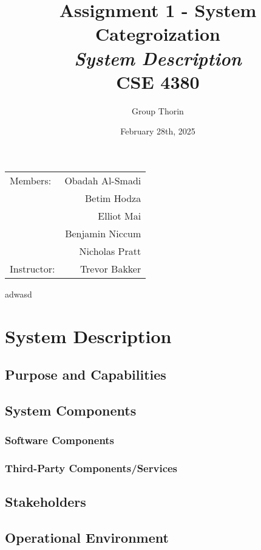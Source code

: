 \documentclass{article}
\title{Assignment 1 - System Categroization \\ \textit{System Description}\\ CSE 4380}
\author{Group Thorin}
\date{February 28th, 2025}
\begin{document}
\maketitle
\begin{center}
\begin{tabular}{l r}

Members: 	& Obadah Al-Smadi\\
			& Betim Hodza\\
			& Elliot Mai\\
			& Benjamin Niccum\\
        	& Nicholas Pratt\\
Instructor: & Trevor Bakker\end{tabular}
\end{center}

\newpage

\setcounter{tocdepth}{2}
\tableofcontents
\newpage

\listoffigures
\listoftables
\newpage
adwasd

\section{System Description}


\subsection{Purpose and Capabilities}


\subsection{System Components}


\subsubsection{Software Components}


\subsubsection{Third-Party Components/Services}


\subsection{Stakeholders}


\subsection{Operational Environment}

\end{document}

